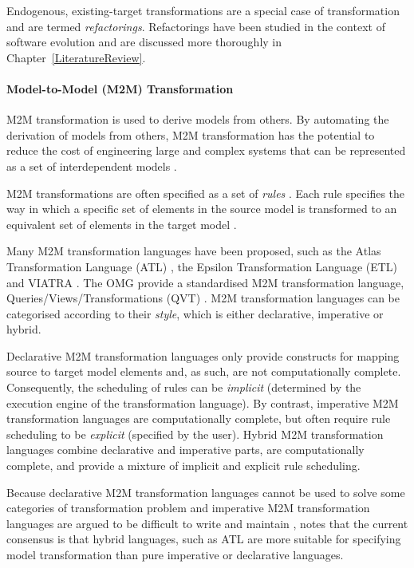 Endogenous, existing-target transformations are a special case of transformation and are termed \emph{refactorings}. Refactorings have been studied in the context of software evolution and are discussed more thoroughly in Chapter~\ref{LiteratureReview}.


\paragraph{Model-to-Model (M2M) Transformation} M2M transformation is used to derive models from others. By automating the derivation of models from others, M2M transformation has the potential to reduce the cost of engineering large and complex systems that can be represented as a set of interdependent models \cite{sendall03heart}. 

M2M transformations are often specified as a set of \emph{rules} \cite{czarnecki06survey}. Each rule specifies the way in which a specific set of elements in the source model is transformed to an equivalent set of elements in the target model \cite[pg.44]{kolovos09thesis}.

Many M2M transformation languages have been proposed, such as the Atlas Transformation Language (ATL) \cite{jouault05transforming}, the Epsilon Transformation Language (ETL) \cite{kolovos08etl} and VIATRA \cite{VIATRA}. The OMG \cite{omg} provide a standardised M2M transformation language, Queries/Views/Transformations (QVT) \cite{qvt}. M2M transformation languages can be categorised according to their \emph{style}, which is either declarative, imperative or hybrid.

Declarative M2M transformation languages only provide constructs for mapping source to target model elements and, as such, are not computationally complete. Consequently, the scheduling of rules can be \emph{implicit} (determined by the execution engine of the transformation language). By contrast, imperative M2M transformation languages are computationally complete, but often require rule scheduling to be \emph{explicit} (specified by the user). Hybrid M2M transformation languages combine declarative and imperative parts, are computationally complete, and provide a mixture of implicit and explicit rule scheduling.

Because declarative M2M transformation languages cannot be used to solve some categories of transformation problem \cite{patrascoiu04embedding} and imperative M2M transformation languages are argued to be difficult to write and maintain \cite[pg.45]{kolovos09thesis}, \cite{kolovos08etl} notes that the current consensus is that hybrid languages, such as ATL are more suitable for specifying model transformation than pure imperative or declarative languages.

